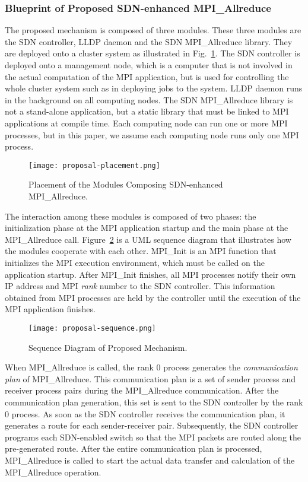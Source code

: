 \subsubsection{Blueprint of Proposed SDN-enhanced MPI\_Allreduce}

The proposed mechanism is composed of three modules. These three modules are
the SDN controller, LLDP daemon and the SDN MPI\_Allreduce library. They are
deployed onto a cluster system as illustrated in
Fig.~\ref{fig-proposal-placement}. The SDN controller is deployed onto a
management node, which is a computer that is not involved in the actual
computation of the MPI application, but is used for controlling the whole
cluster system such as in deploying jobs to the system. LLDP daemon runs in
the background on all computing nodes. The SDN MPI\_Allreduce library is not a
stand-alone application, but a static library that must be linked to MPI
applications at compile time. Each computing node can run one or more MPI
processes, but in this paper, we assume each computing node runs only one MPI
process.

\begin{figure}[htbp]
    \centering
    \texttt{[image: proposal-placement.png]}
    \caption{Placement of the Modules Composing SDN-enhanced MPI\_Allreduce.}%
    \label{fig-proposal-placement}
\end{figure}

The interaction among these modules is composed of two phases: the
initialization phase at the MPI application startup and the main phase at the
MPI\_Allreduce call. Figure~\ref{fig-proposal-sequence} is a UML sequence
diagram that illustrates how the modules cooperate with each other. MPI\_Init
is an MPI function that initializes the MPI execution environment, which must
be called on the application startup. After MPI\_Init finishes, all MPI
processes notify their own IP address and MPI \emph{rank} number to the SDN
controller. This information obtained from MPI processes are held by the
controller until the execution of the MPI application finishes.

\begin{figure}[htbp]
    \centering
    \texttt{[image: proposal-sequence.png]}
    \caption{Sequence Diagram of Proposed Mechanism.}%
    \label{fig-proposal-sequence}
\end{figure}

When MPI\_Allreduce is called, the rank 0 process generates the
\emph{communication plan} of MPI\_Allreduce. This communication plan is a set
of sender process and receiver process pairs during the MPI\_Allreduce
communication. After the communication plan generation, this set is sent to
the SDN controller by the rank 0 process. As soon as the SDN controller
receives the communication plan, it generates a route for each sender-receiver
pair. Subsequently, the SDN controller programs each SDN-enabled switch so
that the MPI packets are routed along the pre-generated route. After the
entire communication plan is processed, MPI\_Allreduce is called to start the
actual data transfer and calculation of the MPI\_Allreduce operation.

